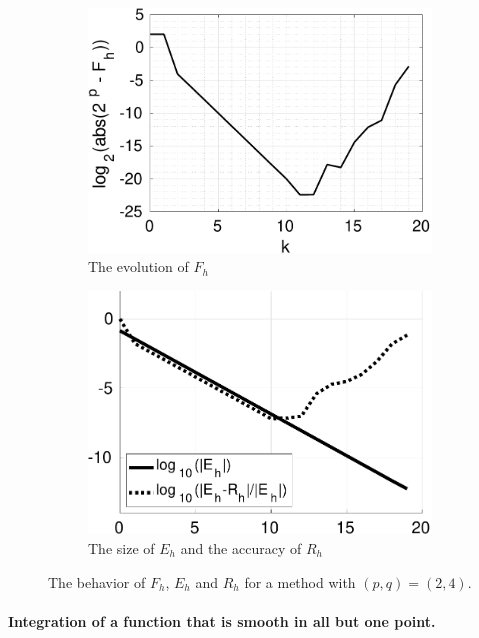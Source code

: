 \documentclass[runningheads]{llncs}
\begin{document}
\begin{figure}[h]
\begin{subfigure}[h]{0.49\linewidth}
\includegraphics[width=\linewidth]{rint_mwe1a.pdf}
\caption{The evolution of $F_h$} \label{fig:rint_mwe1a}
\end{subfigure}
\hfill
\begin{subfigure}[h]{0.49\linewidth}
\includegraphics[width=\linewidth]{rint_mwe1b.pdf}
\caption{The size of $E_h$ and the accuracy of $R_h$} \label{fig:rint_mwe1b}
\end{subfigure}%
\caption{The behavior of $F_h$, $E_h$ and $R_h$ for a method with $(p,q) = (2,4)$.}
\end{figure}

\paragraph{Integration of a function that is smooth in all but one point.}
\end{document}
